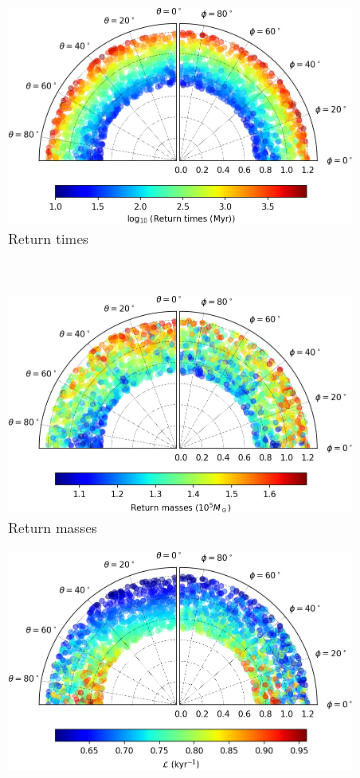 \begin{figure}[h]
    \centering
    \begin{subfigure}[t]{0.4\textwidth}
        \includegraphics[width = \textwidth]{"../Files/Week 13/images/16_time"}
        \caption{Return times}
    \end{subfigure}
    ~ 
    \begin{subfigure}[t]{0.4\textwidth}
        \includegraphics[width=\textwidth]{"../Files/Week 13/images/16_mass"}
        \caption{Return masses}
    \end{subfigure}
    \begin{subfigure}[t]{0.4\textwidth}
        \includegraphics[width=\textwidth]{"../Files/Week 13/images/16_lyapunov"}

\end{subfigure}
\end{figure}
